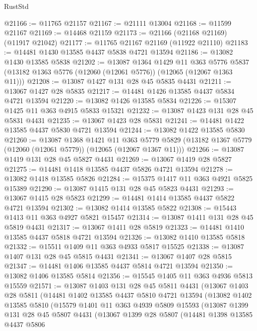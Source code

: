 \begin{lexlean}{RustStd}
\begin{coremodule}
@21166 := @11765 @21157
@21167 := @21111 @13004
@21168 := @11599 @21167
@21169 := @14468 @21159
@21173 := @21166 (@21168 @21169) (@11917 @21042)
@21177 := @11765 @21167 @21169 (@11922 @21110)
@21183 := @14481 @1430 @13585 @4437 @5838 @4721 @13594
@21186 := @13082 @1430 @13585 @5838
@21202 := @13087
    @1364
    @1429
    @11
    @363
    @5776
    @5837
    (@13182 @1363 @5776 (@12060 (@12061 @5776)) (@12065 (@12067 @1363 @11)))
@21208 := @13087 @1427 @131 @28 @45 @5835 @4431
@21211 := @13067 @1427 @28 @5835
@21217 := @14481 @1426 @13585 @4437 @5834 @4721 @13594
@21220 := @13082 @1426 @13585 @5834
@21226 := @15307 @1425 @11 @363 @4915 @5833 @15321
@21232 := @13087 @1423 @131 @28 @45 @5831 @4431
@21235 := @13067 @1423 @28 @5831
@21241 := @14481 @1422 @13585 @4437 @5830 @4721 @13594
@21244 := @13082 @1422 @13585 @5830
@21260 := @13087
    @1368
    @1421
    @11
    @363
    @5779
    @5829
    (@13182 @1367 @5779 (@12060 (@12061 @5779)) (@12065 (@12067 @1367 @11)))
@21266 := @13087 @1419 @131 @28 @45 @5827 @4431
@21269 := @13067 @1419 @28 @5827
@21275 := @14481 @1418 @13585 @4437 @5826 @4721 @13594
@21278 := @13082 @1418 @13585 @5826
@21284 := @15375 @1417 @11 @363 @4921 @5825 @15389
@21290 := @13087 @1415 @131 @28 @45 @5823 @4431
@21293 := @13067 @1415 @28 @5823
@21299 := @14481 @1414 @13585 @4437 @5822 @4721 @13594
@21302 := @13082 @1414 @13585 @5822
@21308 := @15443 @1413 @11 @363 @4927 @5821 @15457
@21314 := @13087 @1411 @131 @28 @45 @5819 @4431
@21317 := @13067 @1411 @28 @5819
@21323 := @14481 @1410 @13585 @4437 @5818 @4721 @13594
@21326 := @13082 @1410 @13585 @5818
@21332 := @15511 @1409 @11 @363 @4933 @5817 @15525
@21338 := @13087 @1407 @131 @28 @45 @5815 @4431
@21341 := @13067 @1407 @28 @5815
@21347 := @14481 @1406 @13585 @4437 @5814 @4721 @13594
@21350 := @13082 @1406 @13585 @5814
@21356 := @15545 @1405 @11 @363 @4936 @5813 @15559
@21571 := @13087
    @1403
    @131
    @28
    @45
    @5811
    @4431
    (@13067
      @1403
      @28
      @5811
      (@14481
        @1402
        @13585
        @4437
        @5810
        @4721
        @13594
        (@13082
          @1402
          @13585
          @5810
          (@15579
            @1401
            @11
            @363
            @4939
            @5809
            @15593
            (@13087
              @1399
              @131
              @28
              @45
              @5807
              @4431
              (@13067
                @1399
                @28
                @5807
                (@14481
                  @1398
                  @13585
                  @4437
                  @5806

\end{coremodule}
\end{lexlean}
